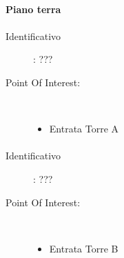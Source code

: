 \documentclass[../SperimentazioniPratiche.tex]{subfiles}
\begin{document}
		\newpage
		\paragraph{Piano terra}		
		
			\paragraph*{}
			\label{00000}
			\begin{tcolorbox}[fonttitle=\bfseries, 
								adjusted title={\Large Beacon 00000},
								sharp corners=south,
								colback=white, 
								colframe=white!50!blue!75!black]
								
				\begin{description}%
					\item[Identificativo]: ???

					\tcbline					
					
					\item[Point Of Interest:] \ \par
					\begin{itemize}
						\item Entrata Torre A
					\end{itemize}					   				
				\end{description}  				
			\end{tcolorbox}
			
			\paragraph*{}
			\label{00001}
			\begin{tcolorbox}[fonttitle=\bfseries, 
								adjusted title={\Large Beacon 00001},
								sharp corners=south,
								colback=white, 
								colframe=white!50!blue!75!black]
								
				\begin{description}%
					\item[Identificativo]: ???

					\tcbline					
					
					\item[Point Of Interest:] \ \par
					\begin{itemize}
						\item Entrata Torre B
					\end{itemize}					   				
				\end{description}  				
			\end{tcolorbox}
			
\end{document}
